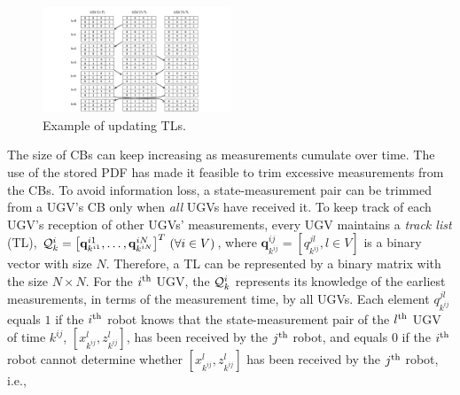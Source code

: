 		
	\begin{figure}%
		\centering
		\includegraphics[width=0.50\textwidth]{figures/track_list}
		\caption{Example of updating TLs.}
		\label{fig:upd_tl}
		\vspace{-1em}
	\end{figure}
	
	The size of CBs can keep increasing as measurements cumulate over time. 
	The use of the stored PDF has made it feasible to trim excessive measurements from the CBs.
	To avoid information loss, a state-measurement pair can be trimmed from a UGV's CB only when \textit{all} UGVs have received it.
	To keep track of each UGV's reception of other UGVs' measurements, every UGV maintains a \textit{track list} (TL), $\mathcal{Q}^i_k=\left[\mathbf{q}^{i1}_{k^{i1}},\dots, \mathbf{q}^{iN}_{k^{iN}}\right]^T \,(\forall i\in V)$, where $\mathbf{q}^{ij}_{k^{ij}}=\left[q^{jl}_{k^{ij}}, l\in V\right]$ is a binary vector with size $N$.
	Therefore, a TL can be represented by a binary matrix with the size $N\times N$.
	For the $i^\text{th}$ UGV, the $\mathcal{Q}^i_k$ represents its knowledge of the earliest measurements, in terms of the measurement time, by all UGVs.	
	Each element $q^{jl}_{k^{ij}}$ equals $1$ if the $i^\text{th}$ robot knows that the state-measurement pair of the $l^\text{th}$ UGV of time $k^{ij}$, $\left[x^l_{k^{ij}},z^l_{k^{ij}}\right]$, has been received by the $j^\text{th}$ robot, and equals $0$ if the $i^\text{th}$ robot cannot determine whether $\left[x^l_{k^{ij}},z^l_{k^{ij}}\right]$ has been received by the $j^\text{th}$ robot, i.e.,
